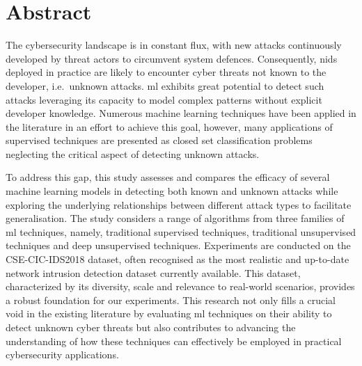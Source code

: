 \chapter*{Abstract}

The cybersecurity landscape is in constant flux, with new attacks continuously
developed by threat actors to circumvent system defences. Consequently,
\gls{nids} deployed in practice are likely to encounter cyber threats not known
to the developer, i.e.\ unknown attacks. \gls{ml} exhibits great potential to
detect such attacks leveraging its capacity to model complex patterns without
explicit developer knowledge. Numerous machine learning techniques have been
applied in the literature in an effort to achieve this goal, however, many
applications of supervised techniques are presented as closed set
classification problems neglecting the critical aspect of detecting unknown
attacks.

To address this gap, this study assesses and compares the efficacy of several
machine learning models in detecting both known and unknown attacks while
exploring the underlying relationships between different attack types to
facilitate generalisation. The study considers a range of algorithms from three
families of \gls{ml} techniques, namely, traditional supervised techniques,
traditional unsupervised techniques and deep unsupervised techniques.
Experiments are conducted on the CSE-CIC-IDS2018 dataset, often recognised as
the most realistic and up-to-date network intrusion detection dataset currently
available. This dataset, characterized by its diversity, scale and relevance to
real-world scenarios, provides a robust foundation for our experiments. This
research not only fills a crucial void in the existing literature by evaluating
\gls{ml} techniques on their ability to detect unknown cyber threats but also
contributes to advancing the understanding of how these techniques can
effectively be employed in practical cybersecurity applications.
